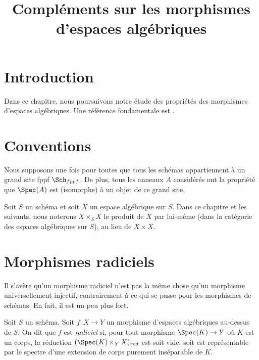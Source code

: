 

%


\title{Compléments sur les morphismes d'espaces algébriques}


\maketitle

\label{section-phantom}

\tableofcontents

\section{Introduction}
\label{section-introduction}

\noindent
Dans ce chapitre, nous poursuivons notre étude des propriétés des morphismes d'espaces algébriques.
Une référence fondamentale est \cite{Kn}.





\section{Conventions}
\label{section-conventions}

\noindent
Nous supposons une fois pour toutes que tous les schémas appartiennent à
un grand site fppf $\Sch_{fppf}$. De plus, tous les anneaux $A$ considérés
ont la propriété que $\Spec(A)$ est (isomorphe) à un
objet de ce grand site.

\medskip\noindent
Soit $S$ un schéma et soit $X$ un espace algébrique sur $S$.
Dans ce chapitre et les suivants, nous noterons $X \times_S X$
le produit de $X$ par lui-même (dans la catégorie des espaces algébriques
sur $S$), au lieu de $X \times X$.








\section{Morphismes radiciels}
\label{section-radicial}

\noindent
Il s'avère qu'un morphisme radiciel n'est pas la même chose qu'un morphisme
universellement injectif, contrairement à ce qui se passe pour les
morphismes de schémas. En fait, il est un peu plus fort.

\begin{definition}
\label{definition-radicial}
Soit $S$ un schéma. Soit $f : X \to Y$ un morphisme d'espaces algébriques
au-dessus de $S$. On dit que $f$ est {\it radiciel} si, pour tout morphisme
$\Spec(K) \to Y$ où $K$ est un corps, la réduction
$(\Spec(K) \times_Y X)_{red}$ est soit vide, soit
est représentable par le spectre d'une extension de corps purement inséparable de $K$.
\end{definition}

